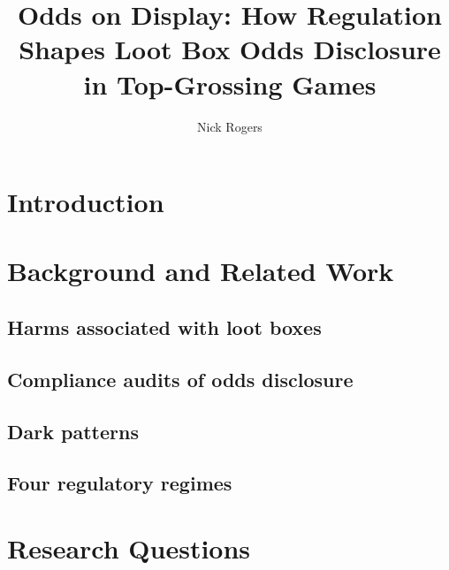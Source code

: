 \documentclass[acmsmall,review,anonymous]{acmart}
\begin{document}
\title{Odds on Display: How Regulation Shapes Loot Box Odds Disclosure in Top-Grossing Games}

\author{Nick Rogers}

\begin{abstract}
\end{abstract}

\begin{CCSXML}
\end{CCSXML}


\maketitle

\section{Introduction}

\section{Background and Related Work}
\subsection{Harms associated with loot boxes}
\subsection{Compliance audits of odds disclosure}
\subsection{Dark patterns}
\subsection{Four regulatory regimes}

\section{Research Questions}
\end{document}
